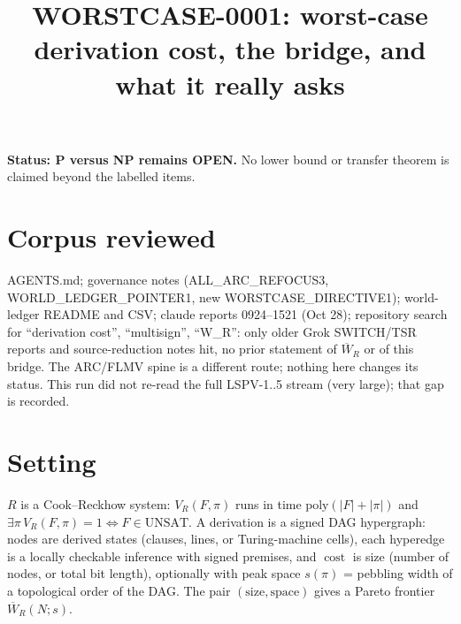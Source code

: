 \documentclass{article}
\begin{document}
\title{WORSTCASE-0001: worst-case derivation cost, the bridge, and what it really asks}
\maketitle
\noindent\textbf{Status: P versus NP remains OPEN.} No lower bound or transfer theorem is claimed beyond the labelled items.

\section{Corpus reviewed}
AGENTS.md; governance notes (ALL\_ARC\_REFOCUS3, WORLD\_LEDGER\_POINTER1, new WORSTCASE\_DIRECTIVE1); world-ledger README and CSV; claude reports 0924--1521 (Oct 28); repository search for ``derivation cost'', ``multisign'', ``W\_R'': only older Grok SWITCH/TSR reports and source-reduction notes hit, no prior statement of $\overline W_R$ or of this bridge. The ARC/FLMV spine is a different route; nothing here changes its status. This run did not re-read the full LSPV-1..5 stream (very large); that gap is recorded.

\section{Setting}
$R$ is a Cook--Reckhow system: $V_R(F,\pi)$ runs in time $\mathrm{poly}(|F|+|\pi|)$ and $\exists\pi\,V_R(F,\pi)=1\iff F\in\mathrm{UNSAT}$. A derivation is a signed DAG hypergraph: nodes are derived states (clauses, lines, or Turing-machine cells), each hyperedge is a locally checkable inference with signed premises, and $\operatorname{cost}$ is size (number of nodes, or total bit length), optionally with peak space $s(\pi)$ = pebbling width of a topological order of the DAG. The pair $(\text{size},\text{space})$ gives a Pareto frontier $\overline W_R(N;s)$.
\end{document}
